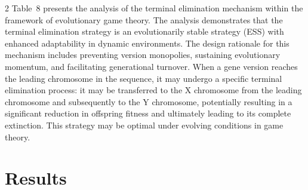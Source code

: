 \documentclass{base}
\begin{document}
\begin{multicols}{2}
Table~8 presents the analysis of the terminal elimination mechanism within the framework of evolutionary game theory. The analysis demonstrates that the terminal elimination strategy is an evolutionarily stable strategy (ESS) with enhanced adaptability in dynamic environments. The design rationale for this mechanism includes preventing version monopolies, sustaining evolutionary momentum, and facilitating generational turnover. When a gene version reaches the leading chromosome in the sequence, it may undergo a specific terminal elimination process: it may be transferred to the X chromosome from the leading chromosome and subsequently to the Y chromosome, potentially resulting in a significant reduction in offspring fitness and ultimately leading to its complete extinction. This strategy may be optimal under evolving conditions in game theory.









\section{Results}%


\end{multicols}
\end{document}
